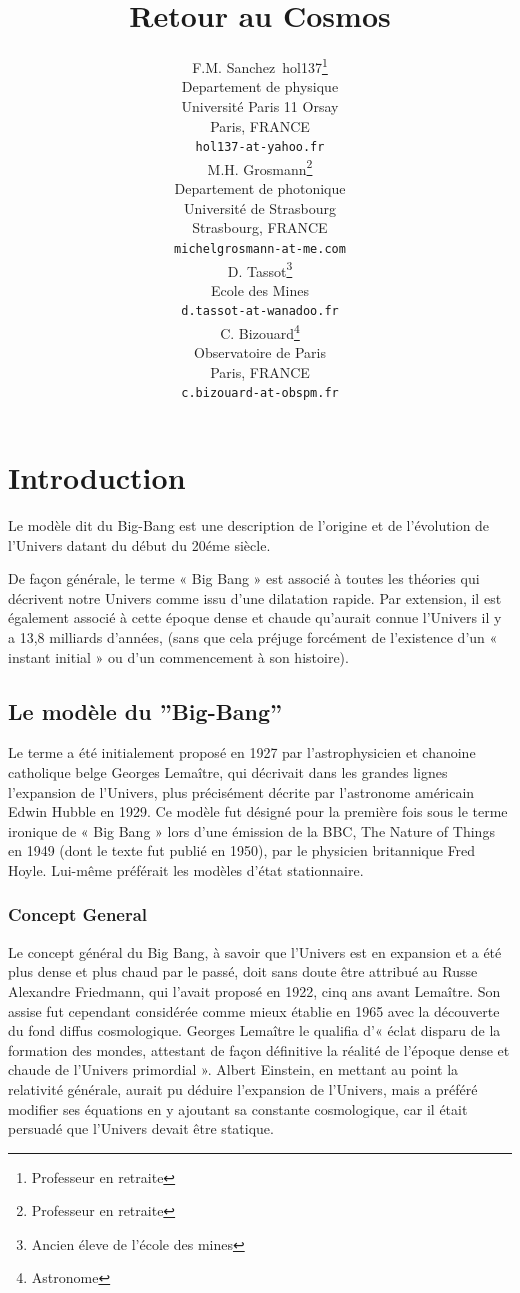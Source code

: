 \documentclass[a4paper,12pt]{article}
\title{Retour au Cosmos}
\author{
  F.M. Sanchez~hol137\thanks{Professeur en retraite} \\
  Departement de physique\\
  Université Paris 11 Orsay \\
  Paris, FRANCE \\
  \texttt{hol137-at-yahoo.fr} \\
   \And
 M.H. Grosmann\thanks{Professeur en retraite} \\
  Departement de photonique\\
  Université de Strasbourg\\
  Strasbourg, FRANCE \\
  \texttt{michelgrosmann-at-me.com} \\
   \And
 D. Tassot\thanks{Ancien éleve de l'école des mines} \\
  Ecole des Mines\\
  \texttt{d.tassot-at-wanadoo.fr} \\
   \And
 C. Bizouard\thanks{Astronome} \\
  Observatoire de Paris\\
  Paris, FRANCE \\
  \texttt{c.bizouard-at-obspm.fr} \\
}
\begin{document}
\maketitle

\tableofcontents
\clearpage

\section*{Introduction}


Le modèle dit du Big-Bang est une description de l'origine et de l'évolution de l’Univers datant du début du 20éme siècle.

De façon générale, le terme « Big Bang » est associé à toutes les théories qui décrivent notre Univers comme issu d'une dilatation rapide. Par extension, il est également associé à cette époque dense et chaude qu’aurait connue l’Univers il y a 13,8 milliards d’années, (sans que cela préjuge forcément de l’existence d’un « instant initial » ou d’un commencement à son histoire).

\subsection{Le modèle du ”Big-Bang”}
\label{sec:headings}

Le terme a été initialement proposé en 1927 par l'astrophysicien  et chanoine catholique belge Georges Lemaître, qui décrivait dans les grandes lignes l’expansion de l'Univers, plus précisément décrite par l'astronome américain Edwin Hubble en 1929. Ce modèle fut désigné pour la première fois sous le terme ironique de « Big Bang » lors d’une émission de la BBC, The Nature of Things en 1949 (dont le texte fut publié en 1950), par le physicien britannique Fred Hoyle. Lui-même préférait les modèles d'état stationnaire.


\subsubsection{Concept General}
Le concept général du Big Bang, à savoir que l’Univers est en expansion et a été plus dense et plus chaud par le passé, doit sans doute être attribué au Russe Alexandre Friedmann, qui l'avait proposé en 1922, cinq ans avant Lemaître. Son assise fut cependant considérée comme mieux établie en 1965 avec la découverte du fond diffus cosmologique. Georges Lemaître le qualifia d’« éclat disparu de la formation des mondes, attestant de façon définitive la réalité de l’époque dense et chaude de l’Univers primordial ». Albert Einstein, en mettant au point la relativité générale, aurait pu déduire l'expansion de l'Univers, mais a préféré modifier ses équations en y ajoutant sa constante cosmologique, car il était persuadé que l'Univers devait être statique.
\end{document}
